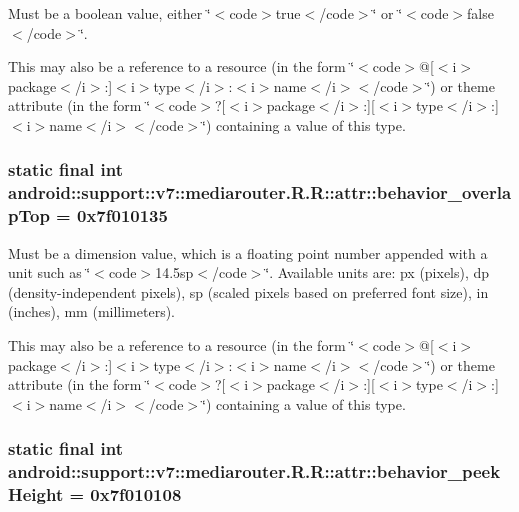 Must be a boolean value, either \char`\"{}$<$code$>$true$<$/code$>$\char`\"{} or \char`\"{}$<$code$>$false$<$/code$>$\char`\"{}. 

This may also be a reference to a resource (in the form \char`\"{}$<$code$>$@\mbox{[}$<$i$>$package$<$/i$>$:\mbox{]}$<$i$>$type$<$/i$>$:$<$i$>$name$<$/i$>$$<$/code$>$\char`\"{}) or theme attribute (in the form \char`\"{}$<$code$>$?\mbox{[}$<$i$>$package$<$/i$>$:\mbox{]}\mbox{[}$<$i$>$type$<$/i$>$:\mbox{]}$<$i$>$name$<$/i$>$$<$/code$>$\char`\"{}) containing a value of this type. \hypertarget{classandroid_1_1support_1_1v7_1_1mediarouter_1_1_r_1_1attr_a1a659c46861326ff6de222be0139779}{
\subsubsection[{behavior\_\-overlapTop}]{\setlength{\rightskip}{0pt plus 5cm}static final int android::support::v7::mediarouter.R.R::attr::behavior\_\-overlapTop = 0x7f010135}}
\label{classandroid_1_1support_1_1v7_1_1mediarouter_1_1_r_1_1attr_a1a659c46861326ff6de222be0139779}


Must be a dimension value, which is a floating point number appended with a unit such as \char`\"{}$<$code$>$14.5sp$<$/code$>$\char`\"{}. Available units are: px (pixels), dp (density-independent pixels), sp (scaled pixels based on preferred font size), in (inches), mm (millimeters). 

This may also be a reference to a resource (in the form \char`\"{}$<$code$>$@\mbox{[}$<$i$>$package$<$/i$>$:\mbox{]}$<$i$>$type$<$/i$>$:$<$i$>$name$<$/i$>$$<$/code$>$\char`\"{}) or theme attribute (in the form \char`\"{}$<$code$>$?\mbox{[}$<$i$>$package$<$/i$>$:\mbox{]}\mbox{[}$<$i$>$type$<$/i$>$:\mbox{]}$<$i$>$name$<$/i$>$$<$/code$>$\char`\"{}) containing a value of this type. \hypertarget{classandroid_1_1support_1_1v7_1_1mediarouter_1_1_r_1_1attr_a735fdbbee8804084e284dd47ac5e59d}{
\subsubsection[{behavior\_\-peekHeight}]{\setlength{\rightskip}{0pt plus 5cm}static final int android::support::v7::mediarouter.R.R::attr::behavior\_\-peekHeight = 0x7f010108}}
\label{classandroid_1_1support_1_1v7_1_1mediarouter_1_1_r_1_1attr_a735fdbbee8804084e284dd47ac5e59d}


